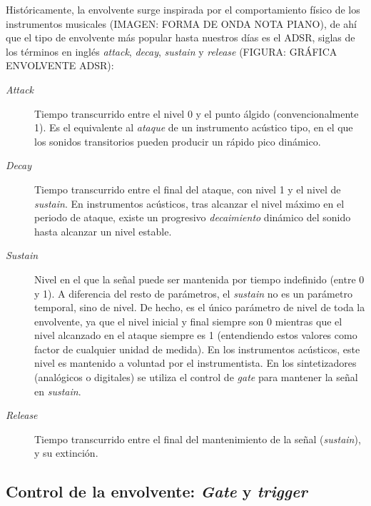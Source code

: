 Históricamente, la envolvente surge inspirada por el comportamiento físico de los instrumentos musicales (IMAGEN: FORMA DE ONDA NOTA PIANO), de ahí que el tipo de envolvente más popular hasta nuestros días es el ADSR, siglas de los términos en inglés \textit{attack}, \textit{decay}, \textit{sustain} y \textit{release} (FIGURA: GRÁFICA ENVOLVENTE ADSR):
\begin{description}
	\item[\textit{Attack}] Tiempo transcurrido entre el nivel 0 y el punto álgido (convencionalmente 1). Es el equivalente al \textit{ataque} de un instrumento acústico tipo, en el que los sonidos transitorios pueden producir un rápido pico dinámico.
	\item[\textit{Decay}] Tiempo transcurrido entre el final del ataque, con nivel 1 y el nivel de \textit{sustain}. En instrumentos acústicos, tras alcanzar el nivel máximo en el periodo de ataque, existe un progresivo \textit{decaimiento} dinámico del sonido hasta alcanzar un nivel estable.
	\item[\textit{Sustain}] Nivel en el que la señal puede ser mantenida por tiempo indefinido (entre 0 y 1). A diferencia del resto de parámetros, el \textit{sustain} no es un parámetro temporal, sino de nivel. De hecho, es el único parámetro de nivel de toda la envolvente, ya que el nivel inicial y final siempre son 0 mientras que el nivel alcanzado en el ataque siempre es 1 (entendiendo estos valores como factor de cualquier unidad de medida). En los instrumentos acústicos, este nivel es mantenido a voluntad por el instrumentista. En los sintetizadores (analógicos o digitales) se utiliza el control de \textit{gate} para mantener la señal en \textit{sustain}.
	\item[\textit{Release}] Tiempo transcurrido entre el final del mantenimiento de la señal (\textit{sustain}), y su extinción. 
\end{description} 

\subsection{Control de la envolvente: \textit{Gate} y \textit{trigger}}

